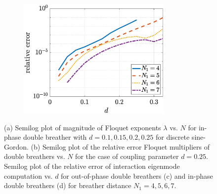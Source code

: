 \documentclass[12pt,reqno]{amsart}
\theoremstyle{definition}
\begin{document}
\begin{figure}
\begin{center}
\begin{subfigure}{0.45\linewidth}
		\caption{}
		\includegraphics[width=7.5cm]{doubleppeigerrord.eps} \hspace{-0.5cm}
		\label{fig:eigerrord} 
	\end{subfigure}
	\end{center}
	\caption{(a) Semilog plot of magnitude of Floquet exponents $\lambda$ vs. $N$ for in-phase double breather with $d = 0.1, 0.15, 0.2, 0.25$ for discrete sine-Gordon. (b) Semilog plot of the relative error Floquet multipliers of double breathers vs. $N$ for the case of 
	coupling parameter $d = 0.25$.
	Semilog plot of the relative error of interaction eigenmode computation vs. $d$ for out-of-phase double breathers (c) and in-phase double breathers (d) for breather distance $N_1 = 4,5,6,7$.}
	\label{fig:eigerror}
\end{figure}
\end{document}
